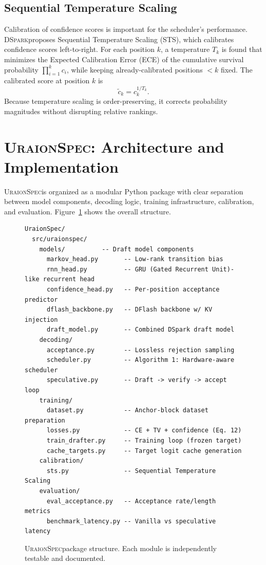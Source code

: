 \documentclass[11pt,a4paper]{article}
\newcommand{\UraionSpec}{\textsc{UraionSpec}}
\newcommand{\DSpark}{\textsc{DSpark}}
\begin{document}
\subsection{Sequential Temperature Scaling}
Calibration of confidence scores is important for the scheduler's
performance. \DSpark proposes Sequential Temperature Scaling (STS), which
calibrates confidence scores left-to-right. For each position $k$, a
temperature $T_k$ is found that minimizes the Expected Calibration Error
(ECE) of the cumulative survival probability $\prod_{i=1}^k c_i$, while
keeping already-calibrated positions $<k$ fixed. The calibrated score at
position $k$ is
\begin{equation}
  \tilde{c}_k = c_k^{1/T_k}.
\end{equation}
Because temperature scaling is order-preserving, it corrects probability
magnitudes without disrupting relative rankings.

\section{\UraionSpec: Architecture and Implementation}
\label{sec:method}

\UraionSpec is organized as a modular Python package with clear separation
between model components, decoding logic, training infrastructure,
calibration, and evaluation. Figure~\ref{fig:architecture} shows the
overall structure.

\begin{figure}[t]
  \centering
  \begin{minipage}{0.85\textwidth}
  \ttfamily\footnotesize
  \begin{verbatim}
UraionSpec/
  src/uraionspec/
    models/          -- Draft model components
      markov_head.py       -- Low-rank transition bias
      rnn_head.py          -- GRU (Gated Recurrent Unit)-like recurrent head
      confidence_head.py   -- Per-position acceptance predictor
      dflash_backbone.py   -- DFlash backbone w/ KV injection
      draft_model.py       -- Combined DSpark draft model
    decoding/
      acceptance.py        -- Lossless rejection sampling
      scheduler.py         -- Algorithm 1: Hardware-aware scheduler
      speculative.py       -- Draft -> verify -> accept loop
    training/
      dataset.py           -- Anchor-block dataset preparation
      losses.py            -- CE + TV + confidence (Eq. 12)
      train_drafter.py     -- Training loop (frozen target)
      cache_targets.py     -- Target logit cache generation
    calibration/
      sts.py               -- Sequential Temperature Scaling
    evaluation/
      eval_acceptance.py   -- Acceptance rate/length metrics
      benchmark_latency.py -- Vanilla vs speculative latency
  \end{verbatim}
  \end{minipage}
  \caption{\UraionSpec package structure. Each module is independently
  testable and documented.}
  \label{fig:architecture}
\end{figure}
\end{document}
